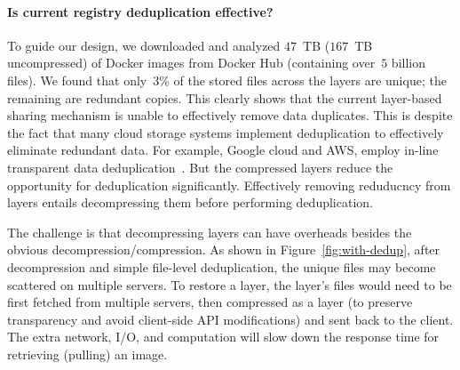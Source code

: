 \paragraph{Is current registry deduplication effective?} 
To guide our design, we downloaded and analyzed 
$47$~TB ($167$~TB uncompressed) of Docker images 
from Docker Hub (containing over~$5$ billion files). We found 
that only~$3$\% of the stored files across the layers are unique; the remaining are redundant copies. 
This clearly shows that the current layer-based sharing mechanism is unable 
to effectively remove data duplicates. This is despite the fact that
many cloud storage systems implement deduplication to effectively eliminate redundant data.
For example,
Google cloud and AWS, 
employ in-line transparent data deduplication~\cite{storReduce}. %
But the compressed layers reduce the opportunity for deduplication significantly. Effectively removing reduducncy from layers entails decompressing them before performing deduplication.

The challenge is that decompressing layers can have overheads besides the obvious decompression/compression. 
As shown in Figure~\ref{fig:with-dedup}, 
after decompression and simple file-level deduplication, the unique files may become scattered on
multiple servers. 
To restore a layer,
the layer's files would need to be first fetched from multiple servers, then compressed as a layer (to preserve transparency and avoid client-side API modifications)
and sent back to the client.
The extra network, I/O, and computation will slow down the response time for retrieving (pulling) an image.


 

